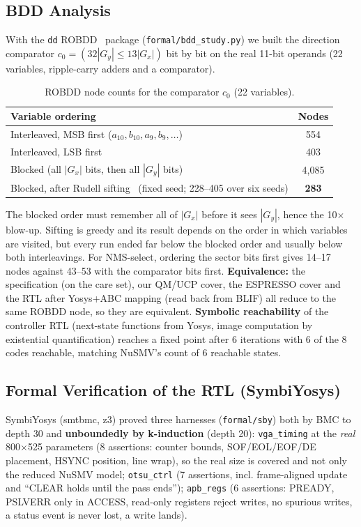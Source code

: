 \documentclass[11pt,a4paper]{article}
\begin{document}
\subsection{BDD Analysis}
With the \texttt{dd} ROBDD~\cite{bryant} package (\texttt{formal/bdd\_study.py}) we built the direction comparator $c_0=(32|G_y|\le13|G_x|)$
bit by bit on the real 11-bit operands (22 variables, ripple-carry adders and a comparator).
\begin{table}[H]\centering\footnotesize
\caption{ROBDD node counts for the comparator $c_0$ (22 variables).}\label{tab:bdd}
\begin{tabular}{@{}lc@{}}
\toprule
Variable ordering & Nodes\\
\midrule
Interleaved, MSB first ($a_{10},b_{10},a_9,b_9,\ldots$) & 554\\
Interleaved, LSB first & 403\\
Blocked (all $|G_x|$ bits, then all $|G_y|$ bits) & 4{,}085\\
Blocked, after Rudell sifting~\cite{rudell} (fixed seed; 228--405 over six seeds) & \textbf{283}\\
\bottomrule
\end{tabular}
\end{table}
The blocked order must remember all of $|G_x|$ before it sees $|G_y|$, hence the 10$\times$ blow-up. Sifting is greedy and its result
depends on the order in which variables are visited, but every run ended far below the blocked order and usually below both interleavings. For NMS-select, ordering the sector bits first gives 14--17 nodes against 43--53 with the comparator bits first.
\textbf{Equivalence:} the specification (on the care set), our QM/UCP cover, the ESPRESSO cover and the RTL after Yosys+ABC mapping
(read back from BLIF) all reduce to the same ROBDD node, so they are equivalent. \textbf{Symbolic reachability} of the controller
RTL (next-state functions from Yosys, image computation by existential quantification) reaches a fixed point after 6 iterations with
6 of the 8 codes reachable, matching NuSMV's count of 6 reachable states.

\subsection{Formal Verification of the RTL (SymbiYosys)}
SymbiYosys (smtbmc, z3) proved three harnesses (\texttt{formal/sby}) both by BMC to depth 30 and \textbf{unboundedly by k-induction}
(depth 20): \texttt{vga\_timing} at the \emph{real} 800$\times$525 parameters (8 assertions: counter bounds, SOF/EOL/EOF/DE
placement, HSYNC position, line wrap), so the real size is covered and not only the reduced NuSMV model; \texttt{otsu\_ctrl} (7 assertions, incl.
frame-aligned update and ``CLEAR holds until the pass ends''); \texttt{apb\_regs} (6 assertions: PREADY, PSLVERR only in ACCESS,
read-only registers reject writes, no spurious writes, a status event is never lost, a write lands).
\end{document}

